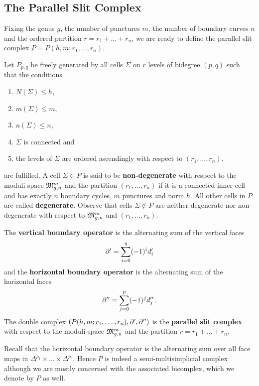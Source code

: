 \subsection{The Parallel Slit Complex}
\label{cellular_models:parallel:bicomplex}
Fixing the genus $g$, the number of punctures $m$, the number of boundary curves $n$ and the ordered partition $r = r_1 + \ldots + r_n$,
we are ready to define the parallel slit complex $P = P(h,m;r_1, \ldots, r_n)$.

\begin{defi}
\label{cellular_models:parallel:parallel_slit_complex}
Let $P_{p,q}$ be freely generated by all cells $\Sigma$ on $r$ levels of bidegree $(p,q)$ such that the conditions
\begin{enumerate}
    \item $N(\Sigma) \le h$,
    \item $m(\Sigma) \le m$,
    \item $n(\Sigma) \le n$,
    \item $\Sigma$ is connected and
    \item the levels of $\Sigma$ are ordered ascendingly with respect to $(r_1, \ldots, r_n)$.
\end{enumerate}
are fulfilled.
A cell $\Sigma \in P$ is said to be {\bf non-degenerate} with respect to the moduli space $\Modspc[n]$ and the partition $(r_1, \ldots, r_n)$
if it is a connected inner cell and has exactly $n$ boundary cycles, $m$ punctures and norm $h$.
All other cells in $P$ are called {\bf degenerate}.
Observe that cells $\Sigma \notin P$ are neither degenerate nor non-degenerate with respect to $\Modspc[n]$ and $(r_1, \ldots, r_n)$.

The {\bf vertical boundary operator} is the alternating sum of the vertical faces
\[
    \del' = \sum_{i=0}^{q}(-1)^i d'_i
\]
and the {\bf horizontal boundary operator} is the alternating sum of the horizontal faces
\[
    \del'' = \sum_{j=0}^{p}(-1)^j d''_j \,.
\]
The double complex $(P(h,m;r_1, \ldots, r_n), \del', \del'')$ is the {\bf parallel slit complex} with respect to the moduli space $\Modspc[n]$ and the partition $r = r_1 + \ldots + r_n$.
\end{defi}

\begin{rem}
Recall that the horizontal boundary operator is the alternating sum over all face maps in $\Delta^{p_1} \times \ldots \times \Delta^{p_r}$.
Hence $P$ is indeed a semi-multisimplicial complex although we are mostly concerned with the associated bicomplex, which we denote by $P$ as well.
\end{rem}

